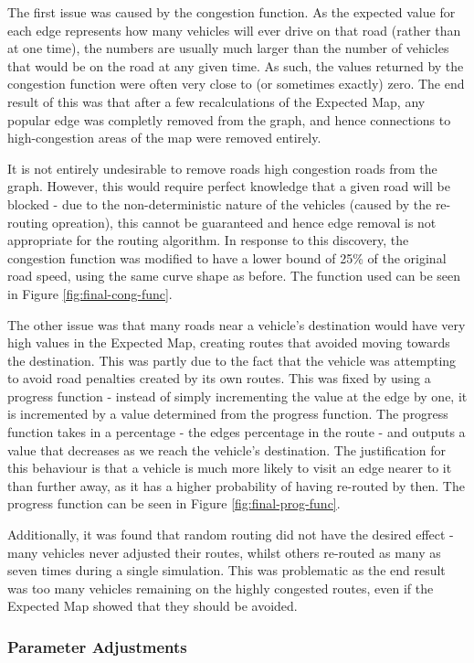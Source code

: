 \documentclass[ %
                    author={Alexander Hill},
                supervisor={Dr. Benjamin Sach},
                    degree={MEng},
                     title={MARMOSET},
                  subtitle={Multi-Agent Route Management using Online Simulation for Efficient Transportation},
                      type={research},
                      year={2016} ]{dissertation}
\begin{document}
The first issue was caused by the congestion function. As the expected value for
each edge represents how many vehicles will ever drive on that road (rather than
at one time), the numbers are usually much larger than the number of vehicles
that would be on the road at any given time. As such, the values returned by the
congestion function were often very close to (or sometimes exactly) zero. The
end result of this was that after a few recalculations of the Expected Map, any
popular edge was completly removed from the graph, and hence connections to
high-congestion areas of the map were removed entirely.

It is not entirely undesirable to remove roads high congestion roads from the
graph. However, this would require perfect knowledge that a given road will be
blocked - due to the non-deterministic nature of the vehicles (caused by the
re-routing opreation), this cannot be guaranteed and hence edge removal is not
appropriate for the routing algorithm. In response to this discovery, the
congestion function was modified to have a lower bound of 25\% of the original
road speed, using the same curve shape as before. The function used can be seen
in Figure \ref{fig:final-cong-func}.

The other issue was that many roads near a vehicle's destination would have very
high values in the Expected Map, creating routes that avoided moving towards the
destination. This was partly due to the fact that the vehicle was attempting to
avoid road penalties created by its own routes. This was fixed by using a
progress function - instead of simply incrementing the value at the edge by one,
it is incremented by a value determined from the progress function. The progress
function takes in a percentage - the edges percentage in the route - and outputs
a value that decreases as we reach the vehicle's destination. The justification
for this behaviour is that a vehicle is much more likely to visit an edge nearer
to it than further away, as it has a higher probability of having re-routed by
then. The progress function can be seen in Figure \ref{fig:final-prog-func}.

Additionally, it was found that random routing did not have the desired effect -
many vehicles never adjusted their routes, whilst others re-routed as many as
seven times during a single simulation. This was problematic as the end result
was too many vehicles remaining on the highly congested routes, even if the
Expected Map showed that they should be avoided.

\subsubsection{Parameter Adjustments}\label{sec:parms}
\end{document}
